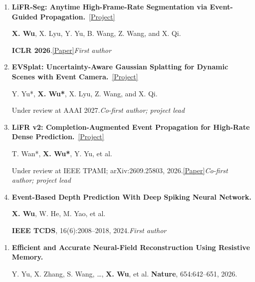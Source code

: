\documentclass[a4paper]{article}
\newcommand{\pubgroup}[1]{%
  \par\vspace{2.0pt}{\color{cvblue}\fontsize{9.4}{10.4}\selectfont\bfseries #1}\par
}
\begin{document}
{\begin{enumerate}[leftmargin=1.6em,labelsep=0.38em,itemsep=0.4pt,topsep=1.3pt,parsep=0pt,partopsep=0pt]
Y. Yu*, \textbf{X. Wu*}, X. Hu, et al.\par
arXiv:2512.04519, 2025.\quad\href{https://arxiv.org/abs/2512.04519}{\textcolor{cvblue}{[Paper]}}\hfill\textcolor{cvblue}{\textit{Co-first author}}
\item \textbf{LiFR-Seg: Anytime High-Frame-Rate Segmentation via Event-Guided Propagation.}~\href{https://candy-crusher.github.io/xiaoshanwu.github.io/projects/lifr-seg/}{\textcolor{cvblue}{[Project]}}\par
\textbf{X. Wu}, X. Lyu, Y. Yu, B. Wang, Z. Wang, and X. Qi.\par
\textbf{ICLR 2026}.\quad\href{https://arxiv.org/abs/2603.21115}{\textcolor{cvblue}{[Paper]}}\hfill\textcolor{cvblue}{\textit{First author}}
\item \textbf{EVSplat: Uncertainty-Aware Gaussian Splatting for Dynamic Scenes with Event Camera.}~\href{https://candy-crusher.github.io/xiaoshanwu.github.io/projects/evsplat/}{\textcolor{cvblue}{[Project]}}\par
Y. Yu*, \textbf{X. Wu*\textdagger}, X. Lyu, Z. Wang, and X. Qi.\par
Under review at AAAI 2027.\hfill\textcolor{cvblue}{\textit{Co-first author; project lead}}
\item \textbf{LiFR v2: Completion-Augmented Event Propagation for High-Rate Dense Prediction.}~\href{https://candy-crusher.github.io/xiaoshanwu.github.io/projects/lifr-v2/}{\textcolor{cvblue}{[Project]}}\par
T. Wan*, \textbf{X. Wu*\textdagger}, Y. Yu, et al.\par
Under review at IEEE TPAMI; arXiv:2609.25803, 2026.\quad\href{https://arxiv.org/abs/2609.25803}{\textcolor{cvblue}{[Paper]}}\hfill\textcolor{cvblue}{\textit{Co-first author; project lead}}
\item \textbf{Event-Based Depth Prediction With Deep Spiking Neural Network.}\par
\textbf{X. Wu}, W. He, M. Yao, et al.\par
\textbf{IEEE TCDS}, 16(6):2008--2018, 2024.\hfill\textcolor{cvblue}{\textit{First author}}
\end{enumerate}
\pubgroup{Collaborative Work}
\begin{enumerate}[resume,leftmargin=1.6em,labelsep=0.38em,itemsep=0.4pt,topsep=1.3pt,parsep=0pt,partopsep=0pt]
\item \textbf{Efficient and Accurate Neural-Field Reconstruction Using Resistive Memory.}\par
Y. Yu, X. Zhang, S. Wang, \ldots, \textbf{X. Wu}, et al. \hfill \textbf{Nature}, 654:642--651, 2026.

\end{enumerate}}
\end{document}
